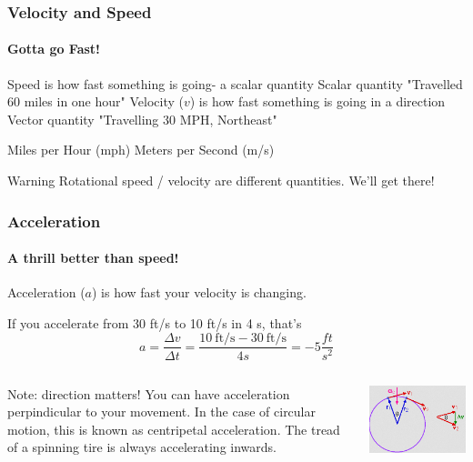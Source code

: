 \documentclass{beamer}%
\begin{document}
\begin{frame}
\frametitle{Velocity and Speed}
\framesubtitle{Gotta go Fast!}

\begin{outline}
	\1 Speed is how fast something is going- a scalar quantity
		\2 Scalar quantity
		\2 "Travelled 60 miles in one hour"
	\1 Velocity ($v$) is how fast something is going in a direction
		\2 Vector quantity
		\2 "Travelling 30 MPH, Northeast"
\end{outline}

\begin{examples}
\begin{outline}
	\1 Miles per Hour (mph)
	\1 Meters per Second (m/s)
\end{outline}
\end{examples}

\begin{alertblock}{Warning}
	Rotational speed / velocity are different quantities. We'll get there!
\end{alertblock}

\end{frame}


\begin{frame}
\frametitle{Acceleration}
\framesubtitle{A thrill better than speed!}

Acceleration ($a$) is how fast your velocity is changing.

If you accelerate from 30 ft/s to 10 ft/s in 4 s, that's
\begin{equation}
	a = \frac{\Delta v}{\Delta t} = \frac{10 \ \mbox{ft/s} - 30 \ \mbox{ft/s}}{4 s} = - 5 \frac{ft}{s^2} \nonumber
\end{equation} 
\begin{columns}
Note: direction matters! You can have acceleration perpindicular to your movement. In the case of circular motion, this is known as centripetal acceleration. The tread of a spinning tire is always accelerating inwards.

\includegraphics[width=1.0\textwidth]{img_Mechatronics_Terminology_centrip.png}
\end{columns}

\end{frame}
\end{document}
